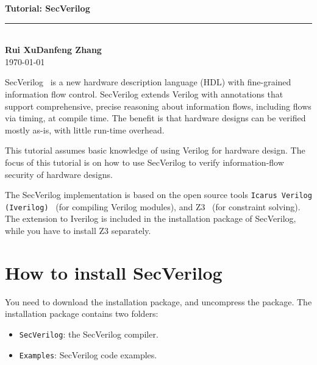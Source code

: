 \documentclass [12pt, oneside, a4paper]{article}
\newcommand{\code}[1]{\texttt{#1}}
\begin{document}
	\begin{center}
	\textrm{\textbf{\LARGE Tutorial: SecVerilog}}\\[0.5cm]
	\rule{14cm}{1pt}\\[0.5cm]
	\textbf{Rui Xu\qquad Danfeng Zhang}\\[1mm]
	\today
	\end{center}
SecVerilog~\cite{secverilog} is a new hardware description language (HDL) with
fine-grained information flow control. SecVerilog extends Verilog with
annotations that support comprehensive, precise reasoning about information
flows, including flows via timing, at compile time. The benefit is that
hardware designs can be verified mostly as-is, with little run-time overhead.

This tutorial assumes basic knowledge of using Verilog for hardware design. The
focus of this tutorial is on how to use SecVerilog to verify
information-flow security of hardware designs. 

The SecVerilog implementation is based on the open source tools
\code{Icarus Verilog (Iverilog)}~\cite{iverilog} (for compiling Verilog
modules), and Z3~\cite{z3} (for constraint solving). The extension to
Iverilog is included in the installation package of SecVerilog, while
you have to install Z3 separately.

\section{How to install SecVerilog}

You need to download the installation package, and uncompress the
package. The installation package contains two folders:

\begin{itemize}
\item \code{SecVerilog}: the SecVerilog compiler.

\item \code{Examples}: SecVerilog code examples.
\end{itemize}
\end{document}
